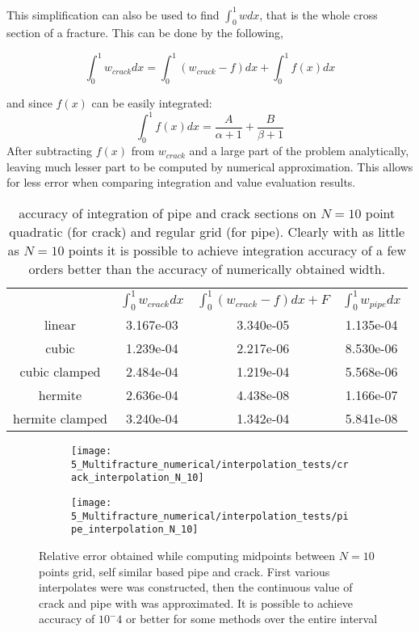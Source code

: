 This simplification can also be used to find $\int_0^1 w dx$, that is the whole cross section of a fracture. This can be done by the following,

\begin{equation}
\int_0^1 w_{crack}dx=\int_0^1 (w_{crack}-f)dx+\int_0^1 f(x) dx
\end{equation}

and since $f(x)$ can be easily integrated:
\begin{equation}
\int_0^1 f(x) dx=\frac{A}{\alpha+1}+\frac{B}{\beta+1}
\end{equation}
After subtracting $f(x)$ from $w_{crack}$ and a large part of the problem analytically, leaving much lesser part to be computed by numerical approximation. This allows for less error when comparing integration and value evaluation results.


\begin{table}[h]
\centering
\begin{tabular}{c|c|c|c}
& $\int_0^1 w_{crack}dx$& $\int_0^1 (w_{crack}-f)dx+F$ & $\int_0^1 w_{pipe}dx$ \\ \cline{1-4}
linear 				&3.167e-03&3.340e-05&1.135e-04 \\ \cline{1-4}
cubic 				&1.239e-04&2.217e-06&8.530e-06 \\ \cline{1-4}
cubic clamped 		&2.484e-04&1.219e-04&5.568e-06\\ \cline{1-4}
hermite 			&2.636e-04&4.438e-08&1.166e-07\\ \cline{1-4}
hermite clamped 		&3.240e-04&1.342e-04&5.841e-08\\ 
\end{tabular}
\caption{accuracy of integration of pipe and crack sections on $N=10$ point quadratic (for crack) and regular grid (for pipe). Clearly with as little as $N=10$ points it is possible to achieve integration accuracy of a few orders better than the accuracy of numerically obtained width. }
\label{tab_last}
\end{table}



\begin{figure}[H]
	\centering
	\begin{subfigure}{0.45\textwidth}
		\centering
		\texttt{[image: 5\_Multifracture\_numerical/interpolation\_tests/crack\_interpolation\_N\_10]}
	\end{subfigure}
	\begin{subfigure}{0.45\textwidth}
		\centering
		\texttt{[image: 5\_Multifracture\_numerical/interpolation\_tests/pipe\_interpolation\_N\_10]}
	\end{subfigure}
	\caption{Relative error obtained while computing midpoints between $N=10$ points grid, self similar based pipe and crack. First various interpolates were was constructed, then the continuous value of crack and pipe with was approximated.  It is possible to achieve accuracy of $10^-4$ or better for some methods over the entire interval}
\end{figure}